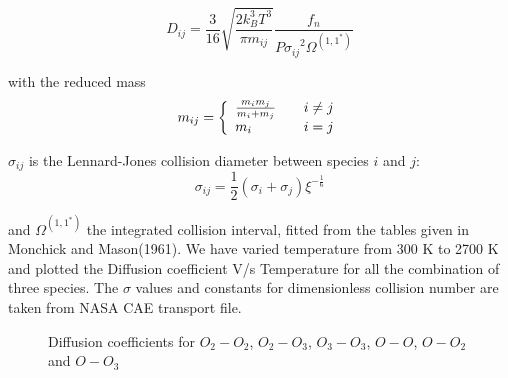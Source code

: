 $$D_{ij} = \frac{3}{16}\sqrt{\frac{2 k_B^3 T^3}{\pi m_{ij}}}\frac{f_n}{{ P \sigma_{ij}}^2   \Omega^{(1,1^*)}}$$

with  the reduced mass
\begin{equation}
m_{ij} = \left\{\begin{array}{l@{\qquad}l}
                \frac{m_i m_j}{m_i + m_j} &  i \neq j \\
                m_i                                  & i=j
                    \end{array}
              \right.
\end{equation}

$\sigma_{ij}$ is the Lennard-Jones collision diameter between species $i$ and $j$:
\begin{equation}
\sigma_{ij} = \frac{1}{2}\left(\sigma_i + \sigma_j\right) \xi^{-\frac{1}{6}}
\end{equation}

\noindent and $\Omega^{(1,1^*)}$ the integrated collision interval, fitted from the tables given in Monchick and Mason(1961). We have varied temperature from 300 K to 2700 K and plotted the Diffusion coefficient V/s Temperature for all the combination of three species. The $\sigma$ values and constants for dimensionless collision number are taken from NASA CAE transport file. 

\begin{figure}[H]


    \caption{Diffusion coefficients for $O_2-O_2$, $O_2-O_3$, $O_3-O_3$, $O-O$, $O-O_2$ and $O-O_3$}
\end{figure}



